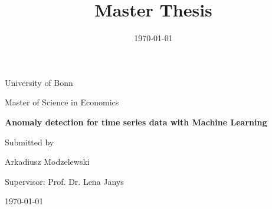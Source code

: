 \documentclass[12pt,a4paper]{scrartcl}
\title{Master Thesis}
\date{\today}
\begin{document}
	\begin{titlepage}
		\centering
		University of Bonn
		
		Master of Science in Economics
		\vspace{1in}
		\vspace{1in}
		
		{\LARGE \bfseries  Anomaly detection for time series data with Machine Learning}
		\vspace{1in}
		
		{\large Submitted by}
		
		{\LARGE  \par
				Arkadiusz Modzelewski\par
				\par}
		
		\vspace{1in}
		
			Supervisor: Prof. Dr. Lena Janys
			
		\vfill
		
		\begin{flushleft}
			\today
		\end{flushleft}
		
	\end{titlepage}
	
	
	\newpage	
	\tableofcontents
	\thispagestyle{empty}
	\newpage


	

	

	

	

	

	

%	
	

	\pagebreak

	\printbibliography

			

\end{document}
